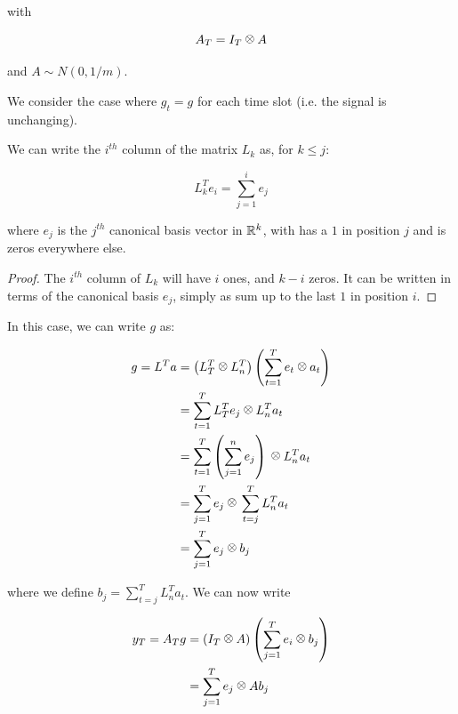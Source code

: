 \documentclass{article}
\begin{document}
with 

\begin{equation}
A_T = I_T \kronecker A
\end{equation}

and \(A \sim N(0, 1/m)\).

We consider the case where \(g_t = g\) for each time slot (i.e. the signal is unchanging). 

\begin{proposition}
We can write the \(i^{th}\) column of the matrix \(L_k\) as, for \(k \leq j\):

\begin{equation}
L_k^T e_i = \sum_{j=1}^i e_j
\end{equation}

where \(e_j\) is the \(j^{th}\) canonical basis vector in \({\mathbb{R}}^k\), with has a \(1\) in position \(j\) and is zeros everywhere else.

\begin{proof}
The \(i^{th}\) column of \(L_k\) will have \(i\) ones, and \(k-i\) zeros. It can be written in terms of the canonical basis \(e_j\), simply as sum up to the last \(1\) in position \(i\).
\end{proof}

\end{proposition}

In this case, we can write \(g\) as:

\begin{align*}
g = L^T a &= \left(L_T^T \kronecker L_n^T\right)\left(\sum_{t=1}^T e_t \kronecker a_t\right) \\
&= \sum_{t=1}^T L_T^T e_j \kronecker L_n^Ta_t \\
&= \sum_{t=1}^T \left(\sum_{j=1}^n e_j \right) \kronecker L_n^T a_t \\
&= \sum_{j=1}^T e_j \kronecker \sum_{t=j}^T L_n^T a_t \\
&= \sum_{j=1}^T e_j \kronecker b_j
\end{align*}

where we define \(b_j = \sum_{t=j}^T L_n^T a_t\). We can now write

\begin{align*}
y_T = A_Tg &= \left(I_T \kronecker A \right) \left(\sum_{j=1}^T e_i \kronecker b_j\right)\\
&= \sum_{j=1}^T e_j \kronecker Ab_j
\end{align*}
\end{document}

